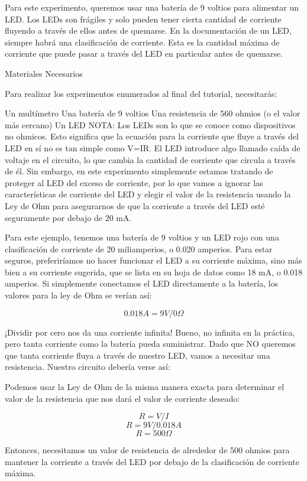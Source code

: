 \documentclass[output=paper, 
colorlinks,
citecolor=brown,
newtxmath
]{langscibook}
\begin{document}
Para este experimento, queremos usar una batería de 9 voltios para alimentar un LED. Los LEDs son frágiles y solo pueden tener cierta cantidad de corriente fluyendo a través de ellos antes de quemarse. En la documentación de un LED, siempre habrá una clasificación de corriente. Esta es la cantidad máxima de corriente que puede pasar a través del LED en particular antes de quemarse.

Materiales Necesarios

Para realizar los experimentos enumerados al final del tutorial, necesitarás:

Un multímetro
Una batería de 9 voltios
Una resistencia de 560 ohmios (o el valor más cercano)
Un LED
NOTA: Los LEDs son lo que se conoce como dispositivos no ohmicos. Esto significa que la ecuación para la corriente que fluye a través del LED en sí no es tan simple como V=IR. El LED introduce algo llamado caída de voltaje en el circuito, lo que cambia la cantidad de corriente que circula a través de él. Sin embargo, en este experimento simplemente estamos tratando de proteger al LED del exceso de corriente, por lo que vamos a ignorar las características de corriente del LED y elegir el valor de la resistencia usando la Ley de Ohm para asegurarnos de que la corriente a través del LED esté seguramente por debajo de 20 mA.

Para este ejemplo, tenemos una batería de 9 voltios y un LED rojo con una clasificación de corriente de 20 miliamperios, o 0.020 amperios. Para estar seguros, preferiríamos no hacer funcionar el LED a su corriente máxima, sino más bien a su corriente sugerida, que se lista en su hoja de datos como 18 mA, o 0.018 amperios. Si simplemente conectamos el LED directamente a la batería, los valores para la ley de Ohm se verían así:

\[0.018A = 9V / 0Ω\]

¡Dividir por cero nos da una corriente infinita! Bueno, no infinita en la práctica, pero tanta corriente como la batería pueda suministrar. Dado que NO queremos que tanta corriente fluya a través de nuestro LED, vamos a necesitar una resistencia. Nuestro circuito debería verse así:

Podemos usar la Ley de Ohm de la misma manera exacta para determinar el valor de la resistencia que nos dará el valor de corriente deseado:

\[R = V / I\]
\[R = 9V / 0.018A\]
\[R = 500Ω\]

Entonces, necesitamos un valor de resistencia de alrededor de 500 ohmios para mantener la corriente a través del LED por debajo de la clasificación de corriente máxima.
\end{document}
